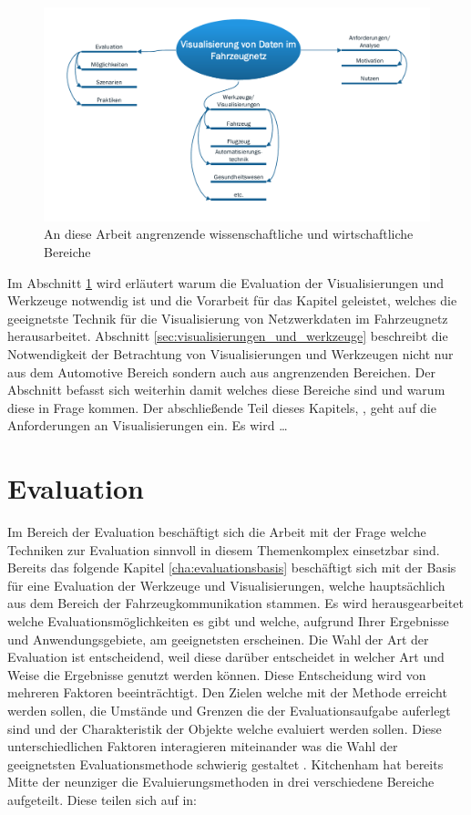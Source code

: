 \documentclass[draft=false
              ,paper=a4
              ,twoside=false
              ,fontsize=11pt
              ,headsepline
              ,BCOR10mm
              ,DIV11
              ]{scrbook}
\begin{document}
\begin{figure}[htbp]
  \centering
  \includegraphics[width=\textwidth]{img/theme_overview.pdf}
  \caption{An diese Arbeit angrenzende wissenschaftliche und wirtschaftliche Bereiche}
  \label{fig:theme_overview}
\end{figure}

Im Abschnitt \ref{sec:evaluation} wird erläutert warum die Evaluation der Visualisierungen und Werkzeuge notwendig ist und die Vorarbeit für das Kapitel  geleistet, welches die geeignetste Technik für die Visualisierung von Netzwerkdaten im Fahrzeugnetz herausarbeitet. Abschnitt \ref{sec:visualisierungen_und_werkzeuge} beschreibt die Notwendigkeit der Betrachtung von Visualisierungen und Werkzeugen nicht nur aus dem Automotive Bereich sondern auch aus angrenzenden Bereichen. Der Abschnitt befasst sich weiterhin damit welches diese Bereiche sind und warum diese in Frage kommen. Der abschließende Teil dieses Kapitels, , geht auf die Anforderungen an Visualisierungen ein. Es wird \dots 

\section{Evaluation} %
\label{sec:evaluation}

Im Bereich der Evaluation beschäftigt sich die Arbeit mit der Frage welche Techniken zur Evaluation sinnvoll in diesem Themenkomplex einsetzbar sind. Bereits das folgende Kapitel \ref{cha:evaluationsbasis} beschäftigt sich mit der Basis für eine Evaluation der Werkzeuge und Visualisierungen, welche hauptsächlich aus dem Bereich der Fahrzeugkommunikation stammen. Es wird herausgearbeitet welche Evaluationsmöglichkeiten es gibt und welche, aufgrund Ihrer Ergebnisse und Anwendungsgebiete, am geeignetsten erscheinen. Die Wahl der Art der Evaluation ist entscheidend, weil diese darüber entscheidet in welcher Art und Weise die Ergebnisse genutzt werden können. Diese Entscheidung wird von mehreren Faktoren beeinträchtigt. Den Zielen welche mit der Methode erreicht werden sollen, die Umstände und Grenzen die der Evaluationsaufgabe auferlegt sind und der Charakteristik der Objekte welche evaluiert werden sollen. Diese unterschiedlichen Faktoren interagieren miteinander was die Wahl der geeignetsten Evaluationsmethode schwierig gestaltet \cite{kitchenham_evaluating_1996-2}. Kitchenham hat bereits Mitte der neunziger die Evaluierungsmethoden in drei verschiedene Bereiche aufgeteilt. Diese teilen sich auf in:
\end{document}
